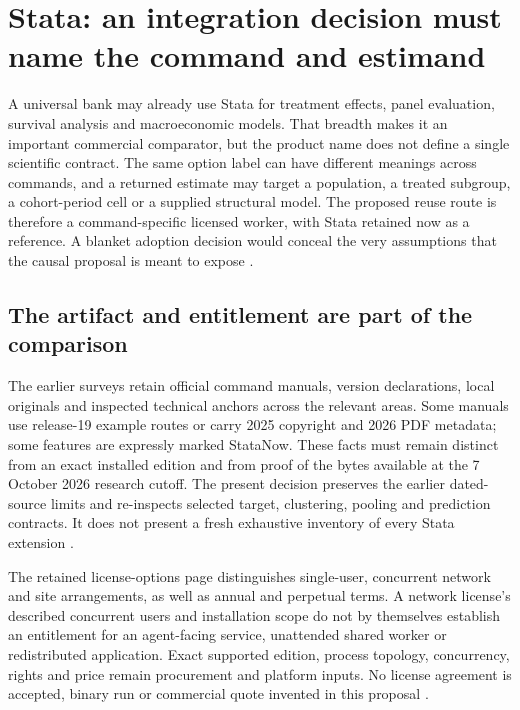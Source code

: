 \section{Stata: an integration decision must name the command and estimand}
\label{sec:exec24-stata-reuse}

A universal bank may already use Stata for treatment effects, panel
evaluation, survival analysis and macroeconomic models. That breadth makes
it an important commercial comparator, but the product name does not define
a single scientific contract. The same option label can have different
meanings across commands, and a returned estimate may target a population,
a treated subgroup, a cohort-period cell or a supplied structural model.
The proposed reuse route is therefore a command-specific licensed worker,
with Stata retained now as a reference. A blanket adoption decision would
conceal the very assumptions that the causal proposal is meant to expose
\cite{exec13_ci_stata_causal_intro,exec18_gp_stata_xthdid,
exec22_state_stata_sspace_post,exec24_stata_choice}.

\subsection{The artifact and entitlement are part of the comparison}
The earlier surveys retain official command manuals, version declarations,
local originals and inspected technical anchors across the relevant areas.
Some manuals use release-19 example routes or carry 2025 copyright and
2026 PDF metadata; some features are expressly marked StataNow. These
facts must remain distinct from an exact installed edition and from proof
of the bytes available at the 7 October 2026 research cutoff. The present
decision preserves the earlier dated-source limits and re-inspects selected
target, clustering, pooling and prediction contracts. It does not present
a fresh exhaustive inventory of every Stata extension
\cite{exec20_med_stata_multiple,exec18_gp_stata_post,exec24_stata_choice}.

The retained license-options page distinguishes single-user, concurrent
network and site arrangements, as well as annual and perpetual terms.
A network license's described concurrent users and installation scope do
not by themselves establish an entitlement for an agent-facing service,
unattended shared worker or redistributed application. Exact supported
edition, process topology, concurrency, rights and price remain procurement
and platform inputs. No license agreement is accepted, binary run or
commercial quote invented in this proposal \cite{exec13_ivrd_license,
exec24_stata_choice}.

